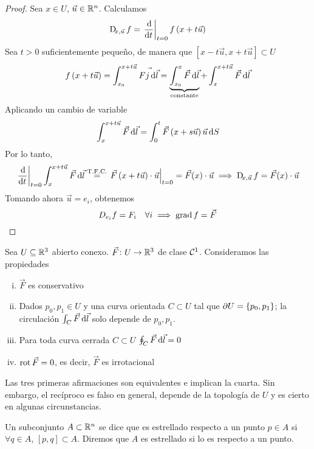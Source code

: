 \begin{proof}
    Sea $x \in U$, $\vec{u} \in \mathbb{R}^n$. Calculamos
    \[
        \Dif_{x, \vec{u}} f = \left. \dv{}{t} \right\vert_{t = 0} f\left( x + t \vec{u} \right)
    \]
    Sea $t > 0$ suficientemente pequeño, de manera que $\left[ x - t \vec{u}, x + t\vec{u}\right] \subset U$
    \begin{gather*}
        f \left( x + t \vec{u} \right) = \int^{x+ t \vec{u}}_{x_0} \vec{Fj \dif \vec{l}} = \underbrace{\int^x_{x_0} \vec{F} \dif \vec{l}}_{\text{constante}}
        + \int^{x + t \vec{u}}_x \vec{F} \dif \vec{l}
    \end{gather*}
    Aplicando un cambio de variable
    \[
        \int^{x + t \vec{u}}_{x} \vec{F} \dif \vec{l} = \int^t_0 \vec{F} \left( x + s \vec{u} \right) \vec{u} \dif S
    \]
    Por lo tanto,
    \[
        \left. \dv{}{t} \right\vert_{t=0} \int^{x + t \vec{u}}_x \vec{F} \dif \vec{l} \stackrel{\text{T.F.C.}}{=}
        \left. \vec{F}\left( x + t \vec{u} \right) \cdot \vec{u} \right\vert_{t=0} = \vec{F}(x) \cdot \vec{u} \implies
        \Dif_{x, \vec{u} }f = \vec{F}(x) \cdot \vec{u}
    \]
    Tomando ahora $\vec{u} = e_i$, obtenemos
    \[
        D_{e_i} f = F_i \quad \forall i \implies \operatorname{grad} f = \vec{F}
    \]
\end{proof}
\pagebreak                                  %
\begin{teo*}
    Sea $U \subseteq \mathbb{R}^3$ abierto conexo. $\vec{F} \colon U \to \mathbb{R}^3$ de clase $\mathcal{C}^1$. Consideramos las propiedades
    \begin{enumerate}[(i)]
        \item $\vec{F}$ es conservativo
        \item Dados $p_0, p_1 \in U$ y una curva orientada $C \subset U$ tal que $\partial U = \left\{p_0, p_1\right\}$; la circulación
            $\int_C \vec{F} \dif \vec{l}$ solo depende de $p_0, p_1$.
        \item Para toda curva cerrada $C \subset U$ $\oint_C \vec{F} \dif \vec{l} = 0$
        \item $\operatorname{rot} \vec{F} = 0$, es decir, $\vec{F}$ es irrotacional
    \end{enumerate}

    Las tres primeras afirmaciones son equivalentes e implican la cuarta. Sin embargo, el recíproco es falso en general,
    depende de la topología de $U$ y es cierto en algunas circunstancias. 
\end{teo*}

\begin{defi}
    Un subconjunto $A \subset \mathbb{R}^n$ se dice que es estrellado respecto a un punto $p \in A$  si $\forall q \in A$,
    $[p, q] \subset A$. Diremos que $A$ es estrellado si lo es respecto a un punto.
\end{defi}

